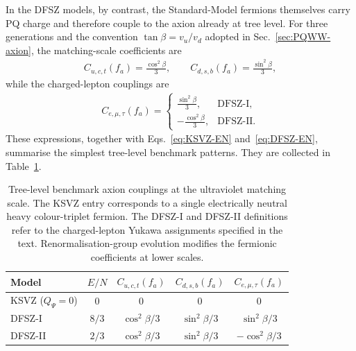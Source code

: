 \documentclass[review]{elsarticle}
\numberwithin{equation}{section}
\numberwithin{table}{section}
\numberwithin{figure}{section}
\begin{document}
In the DFSZ models, by contrast, the Standard-Model fermions themselves carry PQ charge and therefore couple to the axion already at tree level. For three generations and the convention $\tan\beta=v_u/v_d$ adopted in Sec.~\ref{sec:PQWW-axion}, the matching-scale coefficients are~\cite{DiLuzio:2020wdo,DiLuzio:2023tqe}
\begin{align}
    C_{u,c,t}(f_a)
    =
    \frac{\cos^2\beta}{3},
    \qquad
    C_{d,s,b}(f_a)
    =
    \frac{\sin^2\beta}{3},
    \label{eq:DFSZ-quark-couplings}
\end{align}
while the charged-lepton couplings are
\begin{align}
    C_{e,\mu,\tau}(f_a)
    =
    \begin{cases}
        \displaystyle
        \frac{\sin^2\beta}{3},
        & \text{DFSZ-I},\\[2mm]
        \displaystyle
        -\frac{\cos^2\beta}{3},
        & \text{DFSZ-II}.
    \end{cases}
    \label{eq:DFSZ-lepton-couplings}
\end{align}
These expressions, together with Eqs.~\eqref{eq:KSVZ-EN} and~\eqref{eq:DFSZ-EN}, summarise the simplest tree-level benchmark patterns. They are collected in Table~\ref{tab:benchmark-axion-couplings}.

\begin{table}[t]
    \centering
    \begin{tabular}{lcccc}
        \hline
        Model
        & $E/N$
        & $C_{u,c,t}(f_a)$
        & $C_{d,s,b}(f_a)$
        & $C_{e,\mu,\tau}(f_a)$
        \\
        \hline\hline
        KSVZ ($Q_\Psi=0$)
        & $0$
        & $0$
        & $0$
        & $0$
        \\
        DFSZ-I
        & $8/3$
        & $\cos^2\beta/3$
        & $\sin^2\beta/3$
        & $\sin^2\beta/3$
        \\
        DFSZ-II
        & $2/3$
        & $\cos^2\beta/3$
        & $\sin^2\beta/3$
        & $-\cos^2\beta/3$
        \\
        \hline
    \end{tabular}
    \caption{Tree-level benchmark axion couplings at the ultraviolet matching scale. The KSVZ entry corresponds to a single electrically neutral heavy colour-triplet fermion. The DFSZ-I and DFSZ-II definitions refer to the charged-lepton Yukawa assignments specified in the text. Renormalisation-group evolution modifies the fermionic coefficients at lower scales.}
    \label{tab:benchmark-axion-couplings}
\end{table}
\end{document}
